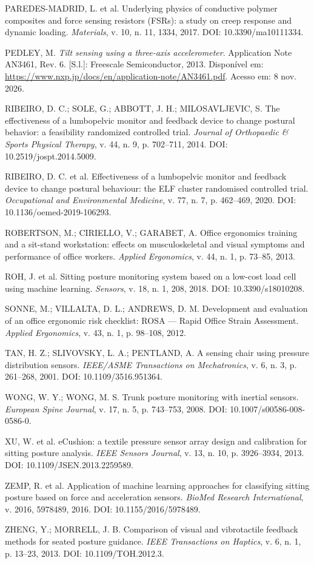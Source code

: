 \begin{singlespace}
PAREDES-MADRID, L. et al. Underlying physics of conductive polymer composites and
force sensing resistors (FSRs): a study on creep response and dynamic loading.
\emph{Materials}, v. 10, n. 11, 1334, 2017. DOI: 10.3390/ma10111334.

PEDLEY, M. \emph{Tilt sensing using a three-axis accelerometer}. Application
Note AN3461, Rev. 6. [S.l.]: Freescale Semiconductor, 2013. Disponível em: \url{https://www.nxp.jp/docs/en/application-note/AN3461.pdf}. Acesso em: 8 nov. 2026.

RIBEIRO, D. C.; SOLE, G.; ABBOTT, J. H.; MILOSAVLJEVIC, S. The effectiveness of a
lumbopelvic monitor and feedback device to change postural behavior: a
feasibility randomized controlled trial. \emph{Journal of Orthopaedic \& Sports
Physical Therapy}, v. 44, n. 9, p. 702--711, 2014. DOI: 10.2519/jospt.2014.5009.

RIBEIRO, D. C. et al. Effectiveness of a lumbopelvic monitor and feedback device
to change postural behaviour: the ELF cluster randomised controlled trial.
\emph{Occupational and Environmental Medicine}, v. 77, n. 7, p. 462--469, 2020.
DOI: 10.1136/oemed-2019-106293.

ROBERTSON, M.; CIRIELLO, V.; GARABET, A. Office ergonomics training and a
sit-stand workstation: effects on musculoskeletal and visual symptoms and
performance of office workers. \emph{Applied Ergonomics}, v. 44, n. 1,
p. 73--85, 2013.

ROH, J. et al. Sitting posture monitoring system based on a low-cost load cell
using machine learning. \emph{Sensors}, v. 18, n. 1, 208, 2018. DOI:
10.3390/s18010208.

SONNE, M.; VILLALTA, D. L.; ANDREWS, D. M. Development and evaluation of an
office ergonomic risk checklist: ROSA --- Rapid Office Strain Assessment.
\emph{Applied Ergonomics}, v. 43, n. 1, p. 98--108, 2012.

TAN, H. Z.; SLIVOVSKY, L. A.; PENTLAND, A. A sensing chair using pressure
distribution sensors. \emph{IEEE/ASME Transactions on Mechatronics}, v. 6, n. 3,
p. 261--268, 2001. DOI: 10.1109/3516.951364.

WONG, W. Y.; WONG, M. S. Trunk posture monitoring with inertial sensors.
\emph{European Spine Journal}, v. 17, n. 5, p. 743--753, 2008. DOI:
10.1007/s00586-008-0586-0.

XU, W. et al. eCushion: a textile pressure sensor array design and calibration
for sitting posture analysis. \emph{IEEE Sensors Journal}, v. 13, n. 10,
p. 3926--3934, 2013. DOI: 10.1109/JSEN.2013.2259589.

ZEMP, R. et al. Application of machine learning approaches for classifying
sitting posture based on force and acceleration sensors. \emph{BioMed Research
International}, v. 2016, 5978489, 2016. DOI: 10.1155/2016/5978489.

ZHENG, Y.; MORRELL, J. B. Comparison of visual and vibrotactile feedback methods
for seated posture guidance. \emph{IEEE Transactions on Haptics}, v. 6, n. 1,
p. 13--23, 2013. DOI: 10.1109/TOH.2012.3.
\end{singlespace}
